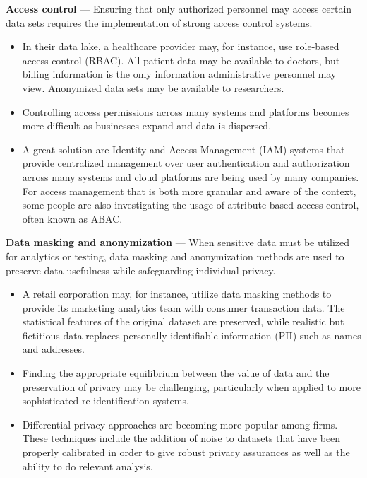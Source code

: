 \textbf{Access control} —  Ensuring that only authorized personnel may access certain data sets requires the implementation of strong access control systems.

\begin{itemize}
    \item In their data lake, a healthcare provider may, for instance, use role-based access control (RBAC). All patient data may be available to doctors, but billing information is the only information administrative personnel may view. Anonymized data sets may be available to researchers.
    \item Controlling access permissions across many systems and platforms becomes more difficult as businesses expand and data is dispersed.
    \item A great solution are Identity and Access Management (IAM) systems that provide centralized management over user authentication and authorization across many systems and cloud platforms are being used by many companies. For access management that is both more granular and aware of the context, some people are also investigating the usage of attribute-based access control, often known as ABAC.
\end{itemize}

\textbf{Data masking and anonymization} — When sensitive data must be utilized for analytics or testing, data masking and anonymization methods are used to preserve data usefulness while safeguarding individual privacy.

\begin{itemize}
    \item A retail corporation may, for instance, utilize data masking methods to provide its marketing analytics team with consumer transaction data. The statistical features of the original dataset are preserved, while realistic but fictitious data replaces personally identifiable information (PII) such as names and addresses.
    \item Finding the appropriate equilibrium between the value of data and the preservation of privacy may be challenging, particularly when applied to more sophisticated re-identification systems.
    \item Differential privacy approaches are becoming more popular among firms. These techniques include the addition of noise to datasets that have been properly calibrated in order to give robust privacy assurances as well as the ability to do relevant analysis.
\end{itemize}

